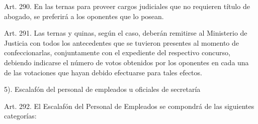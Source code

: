     Art. 290. En las ternas para proveer cargos judiciales que no requieren título de abogado, se preferirá a los oponentes que lo posean.


    Art. 291. Las ternas y quinas, según el caso, deberán remitirse al Ministerio de Justicia con todos los antecedentes que se tuvieron presentes al momento de confeccionarlas, conjuntamente con el expediente del respectivo concurso, debiendo indicarse el número de votos obtenidos por los oponentes en cada una de las votaciones que hayan debido efectuarse para tales efectos.


    5). Escalafón del personal de empleados u oficiales de secretaría




    Art. 292. El Escalafón del Personal de Empleados se compondrá de las siguientes categorías:

